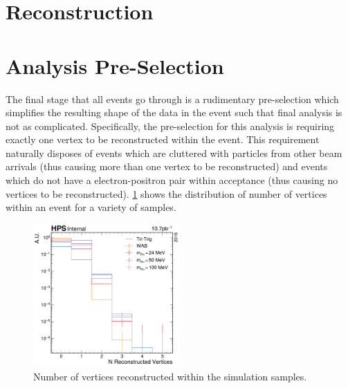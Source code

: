 \section{Reconstruction}

\section{Analysis Pre-Selection}
The final stage that all events go through is a rudimentary pre-selection which simplifies the
resulting shape of the data in the event such that final analysis is not as complicated.
Specifically, the pre-selection for this analysis is requiring exactly one vertex to be
reconstructed within the event. This requirement naturally disposes of events which are cluttered
with particles from other beam arrivals (thus causing more than one vertex to be reconstructed) and
events which do not have a electron-positron pair within acceptance (thus causing no vertices to be
reconstructed). \cref{fig:n-vertex-pre-selection} shows the distribution of number of vertices
within an event for a variety of samples.

\begin{figure}
  \centering
  \includegraphics[width=0.5\textwidth]{figures/hps/dataset/n-vertex-pre-selection-mc-only.pdf}
  \caption{Number of vertices reconstructed within the simulation samples.}
  \label{fig:n-vertex-pre-selection}
\end{figure}
